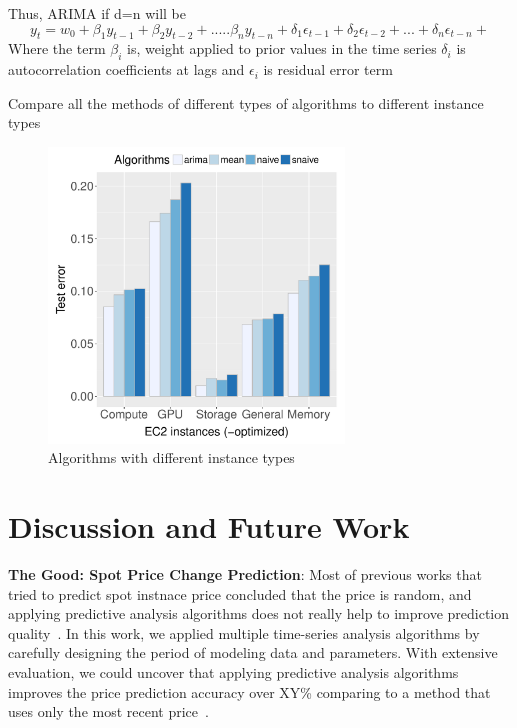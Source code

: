 \documentclass[graybox]{svmult}
\begin{document}
Thus, ARIMA if d=n will be 
\begin{equation}
 y_t = w_0 +\beta_1 y_{t-1}+ \beta_2 y_{t-2}+.....\beta_n y_{t-n} +  \delta_1 \epsilon_{t-1}+  \delta_2 \epsilon_{t-2}+...+ \delta_n \epsilon_{t-n}+
\label{Eq-ARIMA}
\end{equation}
Where the term \(\beta_i \) is, weight applied to prior values in the time series \(\delta_i \) is autocorrelation coefficients at lags and \(\epsilon_i \) is residual error term 

Compare all the methods of different types of algorithms to different instance types
\begin{figure}
\centering\includegraphics[width=0.7\textwidth]{figures/algorithm-compare-different-instance-type.pdf}\caption{Algorithms with different instance types\label{fig:algo-diff-inst}}
\end{figure}

\section{Discussion and Future Work}
\textbf{The Good: Spot Price Change Prediction}: Most of previous works that tried to predict spot instnace price concluded that the price is random, and applying predictive analysis algorithms does not really help to improve prediction quality~\cite{spot-instance-pricing-analysis,spot-price-han-arima}. In this work, we applied multiple time-series analysis algorithms by carefully designing the period of modeling data and parameters. With extensive evaluation, we could uncover that applying predictive analysis algorithms improves the price prediction accuracy over XY\% comparing to a method that uses only the most recent price~\cite{deep-spot-cloud,not-bid-cloud}.
\end{document}
